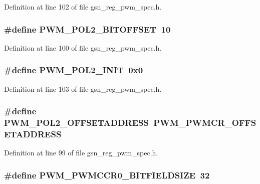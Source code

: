 Definition at line 102 of file gsn\_\-reg\_\-pwm\_\-spec.h.

\hypertarget{a00565_abdd5c3d9c594895666d8876f4fa69d64}{
\subsubsection[{PWM\_\-POL2\_\-BITOFFSET}]{\setlength{\rightskip}{0pt plus 5cm}\#define PWM\_\-POL2\_\-BITOFFSET~10}}
\label{a00565_abdd5c3d9c594895666d8876f4fa69d64}


Definition at line 100 of file gsn\_\-reg\_\-pwm\_\-spec.h.

\hypertarget{a00565_aa558c9f963219dc5822698b93ef4f6d6}{
\subsubsection[{PWM\_\-POL2\_\-INIT}]{\setlength{\rightskip}{0pt plus 5cm}\#define PWM\_\-POL2\_\-INIT~0x0}}
\label{a00565_aa558c9f963219dc5822698b93ef4f6d6}


Definition at line 103 of file gsn\_\-reg\_\-pwm\_\-spec.h.

\hypertarget{a00565_a2e02d894047e60f171b47ce5c119b22e}{
\subsubsection[{PWM\_\-POL2\_\-OFFSETADDRESS}]{\setlength{\rightskip}{0pt plus 5cm}\#define PWM\_\-POL2\_\-OFFSETADDRESS~PWM\_\-PWMCR\_\-OFFSETADDRESS}}
\label{a00565_a2e02d894047e60f171b47ce5c119b22e}


Definition at line 99 of file gsn\_\-reg\_\-pwm\_\-spec.h.

\hypertarget{a00565_aee0a6aa8798a5a77567630bc95da6238}{
\subsubsection[{PWM\_\-PWMCCR0\_\-BITFIELDSIZE}]{\setlength{\rightskip}{0pt plus 5cm}\#define PWM\_\-PWMCCR0\_\-BITFIELDSIZE~32}}
\label{a00565_aee0a6aa8798a5a77567630bc95da6238}


